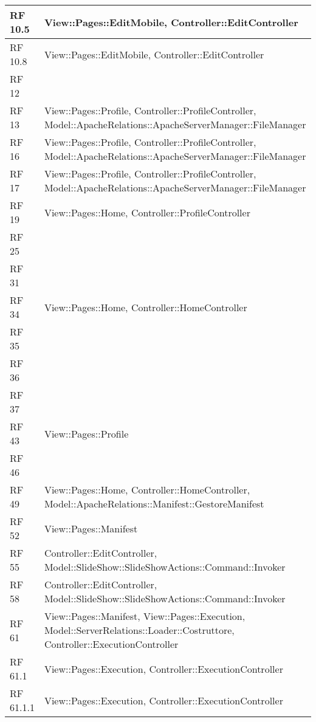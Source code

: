 {\begin{longtable} [c]{| p{2cm} | p{14cm} |}
RF 10.5 & View::\-Pages::\-\-EditMobile, Controller::\-\-EditController\\ 
 \hline 
RF 10.8 & View::\-Pages::\-\-EditMobile, Controller::\-\-EditController\\ 
 \hline 
RF 12 & \\ 
 \hline 
RF 13 & View::\-Pages::\-\-Profile, Controller::\-\-ProfileController, Model::\-ApacheRelations::\-ApacheServerManager::\-\-FileManager\\ 
 \hline 
RF 16 & View::\-Pages::\-\-Profile, Controller::\-\-ProfileController, Model::\-ApacheRelations::\-ApacheServerManager::\-\-FileManager\\ 
 \hline 
RF 17 & View::\-Pages::\-\-Profile, Controller::\-\-ProfileController, Model::\-ApacheRelations::\-ApacheServerManager::\-\-FileManager\\ 
 \hline 
RF 19 & View::\-Pages::\-\-Home, Controller::\-\-ProfileController\\ 
 \hline 
RF 25 & \\ 
 \hline 
RF 31 & \\ 
 \hline 
RF 34 & View::\-Pages::\-\-Home, Controller::\-\-HomeController\\ 
 \hline 
RF 35 & \\ 
 \hline 
RF 36 & \\ 
 \hline 
RF 37 & \\ 
 \hline 
RF 43 & View::\-Pages::\-\-Profile\\ 
 \hline 
RF 46 & \\ 
 \hline 
RF 49 & View::\-Pages::\-\-Home, Controller::\-\-HomeController, Model::\-ApacheRelations::\-Manifest::\-\-GestoreManifest\\ 
 \hline 
RF 52 & View::\-Pages::\-\-Manifest\\ 
 \hline 
RF 55 & Controller::\-\-EditController, Model::\-SlideShow::\-SlideShowActions::\-Command::\-\-Invoker\\ 
 \hline 
RF 58 & Controller::\-\-EditController, Model::\-SlideShow::\-SlideShowActions::\-Command::\-\-Invoker\\ 
 \hline 
RF 61 & View::\-Pages::\-\-Manifest, View::\-Pages::\-\-Execution, Model::\-ServerRelations::\-Loader::\-\-Costruttore, Controller::\-\-ExecutionController\\ 
 \hline 
RF 61.1 & View::\-Pages::\-\-Execution, Controller::\-\-ExecutionController\\ 
 \hline 
RF 61.1.1 & View::\-Pages::\-\-Execution, Controller::\-\-ExecutionController\\ 
 \hline 

\end{longtable}}
